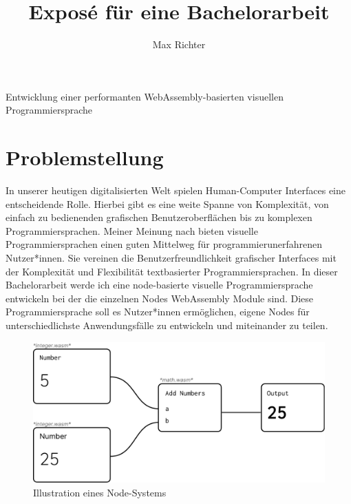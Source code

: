 \documentclass[ngerman]{article}
\title{Exposé für eine Bachelorarbeit}
\author{Max Richter}
\begin{document}
\pagestyle{fancy}
\fancyhead{} %
\fancyfoot{} %
\fancyfoot[LE,RO]{\thepage}

\raggedright

\maketitle
\pagebreak

{\LARGE Entwicklung einer performanten WebAssembly-basierten visuellen Programmiersprache}
  
\section{Problemstellung}
In unserer heutigen digitalisierten Welt spielen Human-Computer Interfaces eine entscheidende Rolle. Hierbei gibt es eine weite Spanne von Komplexität, von einfach zu bedienenden grafischen Benutzeroberflächen bis zu komplexen Programmiersprachen. Meiner Meinung nach bieten visuelle Programmiersprachen einen guten Mittelweg für programmierunerfahrenen Nutzer*innen.
Sie vereinen die Benutzerfreundlichkeit grafischer Interfaces mit der Komplexität und Flexibilität textbasierter Programmiersprachen. 
\linebreak
\linebreak
In dieser Bachelorarbeit werde ich eine node-basierte visuelle Programmiersprache entwickeln bei der die einzelnen Nodes WebAssembly Module sind. Diese Programmiersprache soll es Nutzer*innen ermöglichen, eigene Nodes für unterschiedlichste Anwendungsfälle zu entwickeln und miteinander zu teilen.
\begin{figure}[h]
\includegraphics[width=\textwidth]{ideas/nodes.pdf}
\caption{Illustration eines Node-Systems}
\end{figure}
\end{document}
